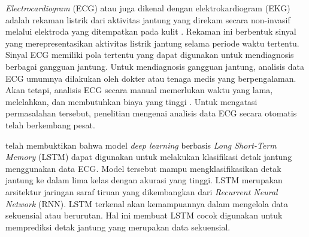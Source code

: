 \textit{Electrocardiogram} (ECG) atau juga dikenal dengan elektrokardiogram (EKG) adalah rekaman listrik dari aktivitas jantung yang direkam secara non-invasif melalui elektroda yang ditempatkan pada kulit \parencite{sattarElectrocardiogram2024}.
Rekaman ini berbentuk sinyal yang merepresentasikan aktivitas listrik jantung selama periode waktu tertentu.
Sinyal ECG memiliki pola tertentu yang dapat digunakan untuk mendiagnosis berbagai gangguan jantung.
Untuk mendiagnosis gangguan jantung, analisis data ECG umumnya dilakukan oleh dokter atau tenaga medis yang berpengalaman.
Akan tetapi, analisis ECG secara manual memerlukan waktu yang lama, melelahkan, dan membutuhkan biaya yang tinggi \parencite{anbalaganAnalysisVariousTechniques2023}.
Untuk mengatasi permasalahan tersebut, penelitian mengenai analisis data ECG secara otomatis telah berkembang pesat.


\textcite{shchetininArrhythmiaDetectionUsing2022} telah membuktikan bahwa model \textit{deep learning} berbasis \emph{Long Short-Term Memory} (LSTM) dapat digunakan untuk melakukan klasifikasi detak jantung menggunakan data ECG.
Model tersebut mampu mengklasifikasikan detak jantung ke dalam lima kelas dengan akurasi yang tinggi.
LSTM merupakan arsitektur jaringan saraf tiruan yang dikembangkan dari \emph{Recurrent Neural Network} (RNN).
LSTM terkenal akan kemampuannya dalam mengelola data sekuensial atau berurutan.
Hal ini membuat LSTM cocok digunakan untuk memprediksi detak jantung yang merupakan data sekuensial.

